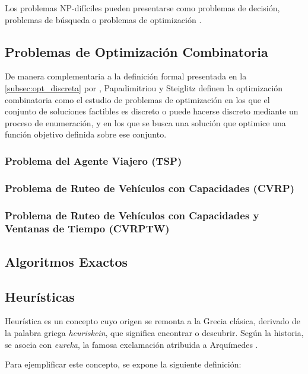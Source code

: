 \documentclass[12pt,titlepage,twoside,openright]{book}
\begin{document}
Los problemas NP-difíciles pueden presentarse como problemas de decisión, problemas de búsqueda o problemas de optimización \citep{maldonado2013problema}.


\subsection{Problemas de Optimización Combinatoria}

De manera complementaria a la definición formal presentada en la \autoref{subsec:opt_discreta} por \citep{cobos2010}, Papadimitriou y Steiglitz \citep{papadimitriou1998} definen la optimización combinatoria como el estudio de problemas de optimización en los que el conjunto de soluciones factibles es discreto o puede hacerse discreto mediante un proceso de enumeración, y en los que se busca una solución que optimice una función objetivo definida sobre ese conjunto.

\subsubsection{Problema del Agente Viajero (TSP)}
\subsubsection{Problema de Ruteo de Vehículos con Capacidades (CVRP)}

\subsubsection{Problema de Ruteo de Vehículos con Capacidades y Ventanas de Tiempo (CVRPTW)}




\subsection{Algoritmos Exactos}

\subsection{Heurísticas}

Heurística es un concepto cuyo origen se remonta a la Grecia clásica, derivado de la palabra griega \textit{heuriskein}, que significa encontrar o descubrir. Según la historia, se asocia con \textit{eureka}, la famosa exclamación atribuida a Arquímedes \citep{antonioSuarez2014}.

Para ejemplificar este concepto, se expone la siguiente definición:
\end{document}
